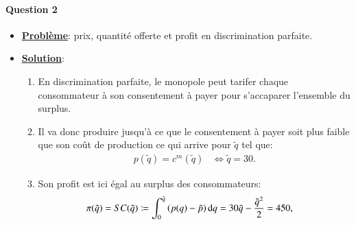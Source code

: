 \documentclass[notes, ignorenonframetext, compress, 9pt, xcolor=svgnames, aspectratio=169]{beamer}
\begin{document}
    \begin{frame}
      [allowframebreaks]{\insertsection}
      \framesubtitle{Question 2\\}
      \begin{itemize}
    \item \textbf{\underline{Problème}}:  prix, quantité offerte et profit en discrimination parfaite.
        \item \textbf{\underline{Solution}}: 
      \begin{enumerate}[$\cdot$]
       \item En discrimination parfaite, le monopole peut tarifer
        chaque consommateur à son consentement à payer pour s’accaparer l’ensemble du surplus. 
        \item Il va donc produire jusqu’à ce que le consentement à payer soit plus faible que son coût de production 
        ce qui arrive pour $\tilde{q}$ tel que:
        \begin{align*}
          p(\tilde{q}) = c^m(\tilde{q}) &\Leftrightarrow \tilde{q} = 30.
        \end{align*}
        \item Son profit est ici égal au surplus des consommateurs:
        \begin{align*}
          \pi(\tilde{q}) &= SC(\tilde{q}) \coloneqq\int_0^{\tilde{q}}\left({p(q) - \tilde{p}}\right)\mathop{}\!\mathrm{d} q =30\tilde{q} - \frac{\tilde{q}^{2}}{2}  = 450,
         \end{align*}
      \end{enumerate}
    \end{itemize}
      \end{frame}
\end{document}
